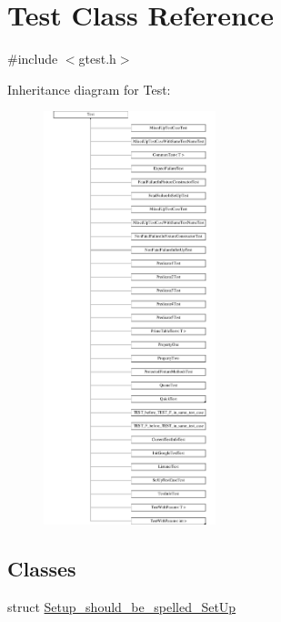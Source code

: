 \hypertarget{classtesting_1_1Test}{\section{\-Test \-Class \-Reference}
\label{db/d9f/classtesting_1_1Test}
}


{\ttfamily \#include $<$gtest.\-h$>$}

\-Inheritance diagram for \-Test\-:\begin{figure}[H]
\begin{center}
\leavevmode
\includegraphics[height=12.000000cm]{db/d9f/classtesting_1_1Test}
\end{center}
\end{figure}
\subsection*{\-Classes}
\begin{DoxyCompactItemize}
\item 
struct \hyperlink{structtesting_1_1Test_1_1Setup__should__be__spelled__SetUp}{\-Setup\-\_\-should\-\_\-be\-\_\-spelled\-\_\-\-Set\-Up}
\end{DoxyCompactItemize}
